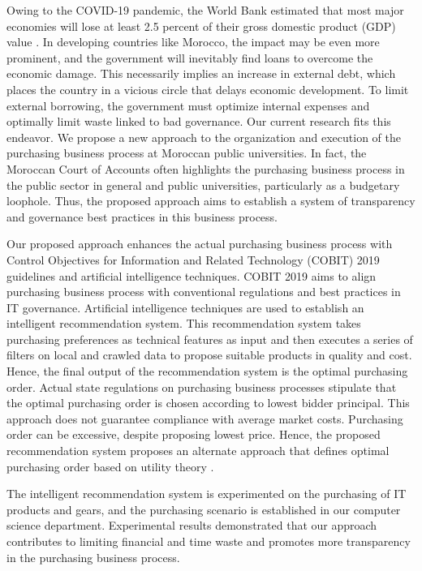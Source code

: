 \documentclass[preprint,3p,onecolumn]{elsarticle}
\begin{document}
\par Owing to the COVID-19 pandemic, the World Bank estimated that most major economies will lose at least 2.5 percent of their gross domestic product (GDP) value \citep{world2020global}. In developing countries like Morocco, the impact may be even more prominent, and the government will inevitably find loans to overcome the economic damage. This necessarily implies an increase in external debt, which places the country in a vicious circle that delays economic development. To limit external borrowing, the government must optimize internal expenses and optimally limit waste linked to bad governance. Our current research fits this endeavor. We propose a new approach to the organization and execution of the purchasing business process  at Moroccan public universities. In fact, the Moroccan Court of Accounts often highlights the purchasing business process in the public sector in general and public universities, particularly as a budgetary loophole. Thus, the proposed approach aims to establish a system of transparency and governance best practices in this business process.
\par Our proposed approach enhances the actual purchasing business process with Control Objectives for Information and Related Technology (COBIT) 2019 guidelines and artificial intelligence techniques. COBIT 2019 aims to align purchasing business process with conventional regulations and best practices in IT governance. Artificial intelligence techniques are used to establish an intelligent recommendation system. This recommendation system takes purchasing preferences as technical features as input and then executes a series of filters on local and crawled data to propose suitable products in quality and cost. Hence, the final output of the recommendation system is the optimal purchasing order. Actual state regulations on purchasing business processes stipulate that the optimal purchasing order is chosen according to lowest bidder principal. This approach does not guarantee compliance with average market costs. Purchasing order can be excessive, despite proposing lowest price. Hence, the proposed recommendation system proposes an alternate approach that defines optimal purchasing order based on utility theory \citep{fishburn1968utility}.
    
\par The intelligent recommendation system is experimented on the purchasing of IT products and gears, and the purchasing scenario is established in our computer science department. Experimental results demonstrated that our approach contributes to limiting financial and time waste and promotes more transparency in the purchasing business process.
\end{document}
